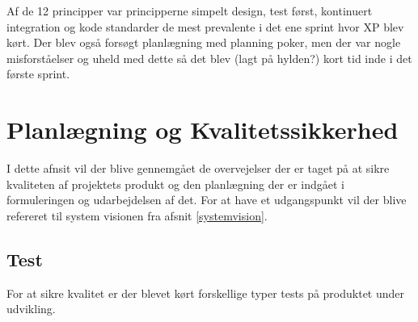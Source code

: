\nl

Af de 12 principper var principperne simpelt design, test først, kontinuert integration og kode standarder de mest prevalente i det ene sprint hvor XP blev kørt. Der blev også forsøgt planlægning med planning poker, men der var nogle misforståelser og uheld med dette så det blev (lagt på hylden?) kort tid inde i det første sprint.

\nl


\section{Planlægning og Kvalitetssikkerhed}\label{planl}
I dette afnsit vil der blive gennemgået de overvejelser der er taget på at sikre kvaliteten af projektets produkt og den planlægning der er indgået i formuleringen og udarbejdelsen af det. For at have et udgangspunkt vil der blive refereret til system visionen fra afsnit \ref{systemvision}.

\nl

\subsection{Test}
For at sikre kvalitet er der blevet kørt forskellige typer tests på produktet under udvikling. 